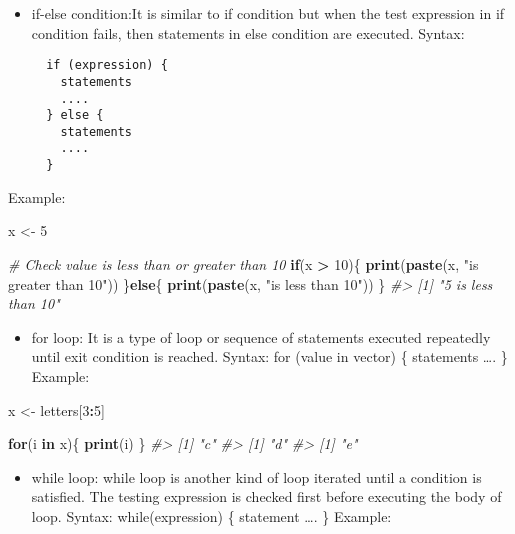 \documentclass[
]{book}
\newenvironment{Shaded}{\begin{snugshade}}{\end{snugshade}}
\newcommand{\CommentTok}[1]{\textcolor[rgb]{0.56,0.35,0.01}{\textit{#1}}}
\newcommand{\ControlFlowTok}[1]{\textcolor[rgb]{0.13,0.29,0.53}{\textbf{#1}}}
\newcommand{\DecValTok}[1]{\textcolor[rgb]{0.00,0.00,0.81}{#1}}
\newcommand{\FunctionTok}[1]{\textcolor[rgb]{0.13,0.29,0.53}{\textbf{#1}}}
\newcommand{\NormalTok}[1]{#1}
\newcommand{\OtherTok}[1]{\textcolor[rgb]{0.56,0.35,0.01}{#1}}
\newcommand{\SpecialCharTok}[1]{\textcolor[rgb]{0.81,0.36,0.00}{\textbf{#1}}}
\newcommand{\StringTok}[1]{\textcolor[rgb]{0.31,0.60,0.02}{#1}}
\providecommand{\tightlist}{%
  \setlength{\itemsep}{0pt}\setlength{\parskip}{0pt}}
\begin{document}
\begin{itemize}
\item
  if-else condition:It is similar to if condition but when the test expression in if condition fails, then statements in else condition are executed.
  Syntax:

\begin{verbatim}
  if (expression) {
    statements
    ....
  } else {
    statements
    ....
  }
\end{verbatim}
\end{itemize}

Example:

\begin{Shaded}
\begin{Highlighting}[]
\NormalTok{x }\OtherTok{\textless{}{-}} \DecValTok{5}

\CommentTok{\# Check value is less than or greater than 10 }
\ControlFlowTok{if}\NormalTok{(x }\SpecialCharTok{\textgreater{}} \DecValTok{10}\NormalTok{)\{ }
  \FunctionTok{print}\NormalTok{(}\FunctionTok{paste}\NormalTok{(x, }\StringTok{"is greater than 10"}\NormalTok{)) }
\NormalTok{\}}\ControlFlowTok{else}\NormalTok{\{ }
  \FunctionTok{print}\NormalTok{(}\FunctionTok{paste}\NormalTok{(x, }\StringTok{"is less than 10"}\NormalTok{)) }
\NormalTok{\}}
\CommentTok{\#\textgreater{} [1] "5 is less than 10"}
\end{Highlighting}
\end{Shaded}

\begin{itemize}
\tightlist
\item
  for loop: It is a type of loop or sequence of statements executed repeatedly until exit condition is reached.
  Syntax:
  for (value in vector) \{
  statements
  \ldots.
  \}
  Example:
\end{itemize}

\begin{Shaded}
\begin{Highlighting}[]
\NormalTok{x }\OtherTok{\textless{}{-}}\NormalTok{ letters[}\DecValTok{3}\SpecialCharTok{:}\DecValTok{5}\NormalTok{] }

\ControlFlowTok{for}\NormalTok{(i }\ControlFlowTok{in}\NormalTok{ x)\{ }
  \FunctionTok{print}\NormalTok{(i) }
\NormalTok{\}}
\CommentTok{\#\textgreater{} [1] "c"}
\CommentTok{\#\textgreater{} [1] "d"}
\CommentTok{\#\textgreater{} [1] "e"}
\end{Highlighting}
\end{Shaded}

\begin{itemize}
\tightlist
\item
  while loop: while loop is another kind of loop iterated until a condition is satisfied. The testing expression is checked first before executing the body of loop.
  Syntax:
  while(expression) \{
  statement
  \ldots.
  \}
  Example:
\end{itemize}
\end{document}
